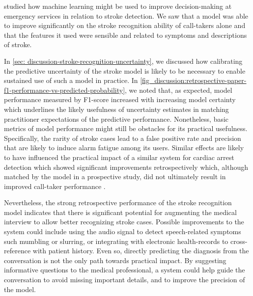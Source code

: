 




\vspace{1em}
\textbf{} studied how machine learning might be used to improve decision-making at emergency services in relation to stroke detection. 
We saw that a model was able to improve significantly on the stroke recognition ability of call-takers alone and that the features it used were sensible and related to symptoms and descriptions of stroke. 

In \cref{sec: discussion-stroke-recognition-uncertainty}, we discussed how calibrating the predictive uncertainty of the stroke model is likely to be necessary to enable sustained use of such a model in practice. In \cref{fig_discussion:retrospective-paper-f1-performance-vs-predicted-probability}, we noted that, as expected, model performance measured by F1-score increased with increasing model certainty which underlines the likely usefulness of uncertainty estimates in matching practitioner expectations of the predictive performance. 
Nonetheless, basic metrics of model performance might still be obstacles for its practical usefulness. Specifically, the rarity of stroke cases lead to a false positive rate and precision that are likely to induce alarm fatigue among its users. Similar effects are likely to have influenced the practical impact of a similar system for cardiac arrest detection which showed significant improvements retrospectively \parencite{cite14} which, although matched by the model in a prospective study, did not ultimately result in improved call-taker performance \parencite{cite15}. 

Nevertheless, the strong retrospective performance of the stroke recognition model indicates that there is significant potential for augmenting the medical interview to allow better recognizing stroke cases. 
Possible improvements to the system could include using the audio signal to detect speech-related symptoms such mumbling or slurring, or integrating with electronic health-records to cross-reference with patient history. 
Even so, directly predicting the diagnosis from the conversation is not the only path towards practical impact. By suggesting informative questions to the medical professional, a system could help guide the conversation to avoid missing important details, and to improve the precision of the model. 


